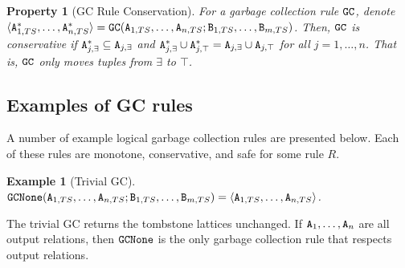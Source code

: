\documentclass{article}
\numberwithin{equation}{section}
\newtheorem{example}{Example}[section]
\newtheorem{property}{Property}[section]
\renewcommand{\tt}[1]{\ifmmode\text{\texttt{#1}}\else\texttt{#1}\fi}
\begin{document}
\begin{property}[GC Rule Conservation]
\label{property:gc_conservative}
For a garbage collection rule $\tt{GC}$, denote
$\langle \tt{A}_{1,TS}^*, \dots, \tt{A}_{n,TS}^* \rangle = \tt{GC}(\tt{A}_{1,TS}, \dots, \tt{A}_{n,TS}; \tt{B}_{1,TS}, \dots, \tt{B}_{m,TS})$.
Then, $\tt{GC}$ is \emph{conservative} if $\tt{A}_{j,\exists}^* \subseteq \tt{A}_{j,\exists}$ and $\tt{A}_{j,\exists}^* \cup \tt{A}_{j,\top}^* = \tt{A}_{j,\exists} \cup \tt{A}_{j,\top}$ for all $j=1,\dots,n$.
That is, $\tt{GC}$ only moves tuples from $\exists$ to $\top$.
\end{property}

\subsection{Examples of GC rules}
\label{sec:logical:example}
A number of example logical garbage collection rules are presented below.
Each of these rules are monotone, conservative, and safe for some rule $R$.
\begin{example}[Trivial GC]
$\tt{GCNone}(\tt{A}_{1,TS}, \dots, \tt{A}_{n,TS}; \tt{B}_{1,TS}, \dots, \tt{B}_{m,TS}) = \langle \tt{A}_{1,TS}, \dots, \tt{A}_{n,TS} \rangle$.
\end{example}
The trivial GC returns the tombstone lattices unchanged.
If $\tt{A}_1, \dots, \tt{A}_n$ are all output relations, then $\tt{GCNone}$ is the only garbage collection rule that respects output relations.
\end{document}
